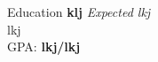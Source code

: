 \documentclass{resume}
\begin{document}
\begin{rSection}{Education}
{\bf klj} \hfill {\em Expected lkj}
\\ lkj
\\ GPA: {\bf lkj/lkj}
\end{rSection}
\end{document}
